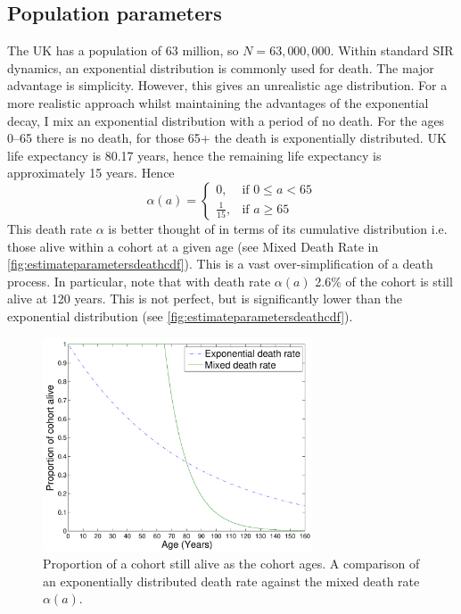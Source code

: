 \documentclass[a4paper,11pt] {scrartcl}
\begin{document}
\subsection{Population parameters}
\label{subsec:estimateparameterspopulation}
The UK has a population of 63 million\cite{worldfactbookuk}, so $N = 63,000,000$. Within standard SIR dynamics, an exponential distribution is commonly used for death. The major advantage is simplicity. However, this gives an unrealistic age distribution. For a more realistic approach whilst maintaining the advantages of the exponential decay, I mix an exponential distribution with a period of no death. For the ages 0--65 there is no death, for those 65+ the death is exponentially distributed. UK life expectancy is 80.17 years, hence the remaining life expectancy is approximately 15 years. Hence
\begin{equation*}
\alpha(a) = \begin{cases} 0, & \mbox{if } 0 \leq a < 65 \\ \frac{1}{15} , & \mbox{if } a\geq 65 \end{cases}
\end{equation*}
This death rate $\alpha$ is better thought of in terms of its cumulative distribution i.e. those alive within a cohort at a given age (see Mixed Death Rate in \autoref{fig:estimateparametersdeathcdf}). This is a vast over-simplification of a death process. In particular, note that with death rate $\alpha(a)$ 2.6\% of the cohort is still alive at 120 years. This is not perfect, but is significantly lower than the exponential distribution (see \autoref{fig:estimateparametersdeathcdf}).

\begin{figure}[h]
	\centering
	\includegraphics[width=80mm]{comparisoncumulativealive}
	\caption{Proportion of a cohort still alive as the cohort ages. A comparison of an exponentially distributed death rate against the mixed death rate $\alpha(a)$.}
	\label{fig:estimateparametersdeathcdf}
\end{figure}
\end{document}
